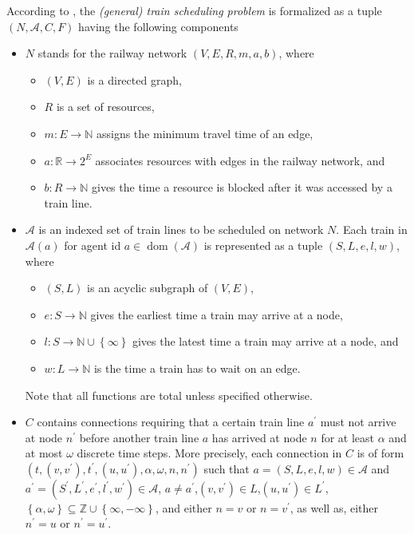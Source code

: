 \documentclass{article}
\DeclareMathOperator{\dom}{dom}
\begin{document}
According to \cite{DBLP:journals/corr/abs-2003-08598},  the \emph{(general) train scheduling problem} is formalized as a tuple $(N, \mathcal{A}, C, F)$ having the following components
\begin{itemize}
    \item $N$ stands for the railway network $(V, E, R, m, a, b)$, where
        \begin{itemize}
            \item $(V, E)$ is a directed graph,
            \item $R$ is a set of resources,
            \item $m:E\to\mathbb{N}$ assigns the minimum travel time of an edge,
            \item $a: \mathbb{R}\to 2^E$ associates resources with edges in the railway network, and
            \item $b:R\to \mathbb{N}$ gives the time a resource is blocked after it was accessed by a train line.
        \end{itemize}
    \item $\mathcal{A}$ is an indexed set of train lines to be scheduled on network $N$. Each train in $\mathcal{A}(a)$ for agent id $a\in \dom(\mathcal{A})$ is represented as a tuple $(S, L, e, l, w)$, where
        \begin{itemize}
            \item $(S, L)$ is an acyclic subgraph of $(V, E)$,
            \item $e:S \to \mathbb{N}$ gives the earliest time a train may arrive at a node,
            \item $l:S\to \mathbb{N} \cup \left\{\infty\right\}$ gives the latest time a train may arrive at a node, and
            \item $w:L\to \mathbb{N}$ is the time a train has to wait on an edge.
        \end{itemize}
        Note that all functions are total unless specified otherwise.
        \item $C$ contains connections requiring that a certain train line $a^\prime$ must not arrive at node $n^\prime$ before another train line $a $ has arrived at node $n$ for at least $\alpha$ and at most $\omega$ discrete time steps. More precisely, each connection in $C$ is of form $(t,(v, v^\prime), t^\prime,(u, u^\prime), \alpha, \omega, n, n^\prime)$ such that $a= (S, L, e, l, w)\in \mathcal{A}$ and $a^\prime= (S^\prime, L^\prime, e^\prime, l^\prime, w^\prime)\in \mathcal{A}$, $a\not=a^\prime$,$(v, v^\prime)\in L$,$(u, u^\prime)\in L^\prime$,$\left\{\alpha,\omega\right\} \subseteq \mathbb{Z} \cup \left\{\infty,-\infty\right\}$, and either $n=v$ or $n=v^\prime$, as well as, either $n^\prime=u$ or $n^\prime=u^\prime$.

\end{itemize}
\end{document}

